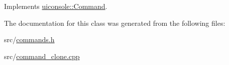 Implements \hyperlink{classuiconsole_1_1Command_a5c4d205b1de13a6b3d0db73ddc7ebefa}{uiconsole::Command}.



The documentation for this class was generated from the following files:\begin{DoxyCompactItemize}
\item 
src/\hyperlink{commands_8h}{commands.h}\item 
src/\hyperlink{command__clone_8cpp}{command\_\-clone.cpp}\end{DoxyCompactItemize}
